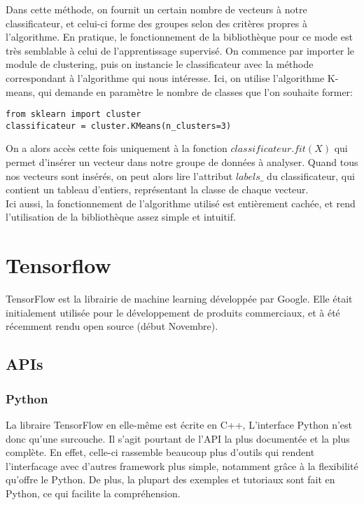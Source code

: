 Dans cette méthode, on fournit un certain nombre de vecteurs à notre classificateur, et celui-ci forme des groupes selon des critères propres à l'algorithme. En pratique, le fonctionnement de la bibliothèque pour ce mode est très semblable à celui de l'apprentissage supervisé.
On commence par importer le module de clustering, puis on instancie le classificateur avec la méthode correspondant à l'algorithme qui nous intéresse. Ici, on utilise l'algorithme K-means, qui demande en paramètre le nombre de classes que l'on souhaite former:
\begin{Verbatim}
from sklearn import cluster
classificateur = cluster.KMeans(n_clusters=3)
\end{Verbatim}
On a alors accès cette fois uniquement à la fonction $classificateur.fit(X)$ qui permet d'insérer un vecteur dans notre groupe de données à analyser. Quand tous nos vecteurs sont insérés, on peut alors lire l'attribut $labels\_$ du classificateur, qui contient un tableau d'entiers, représentant la classe de chaque vecteur.\\

Ici aussi, la fonctionnement de l'algorithme utilisé est entièrement cachée, et rend l'utilisation de la bibliothèque assez simple et intuitif.


\section{Tensorflow}

TensorFlow est la librairie de machine learning développée par Google. Elle était initialement utilisée pour le développement de produits commerciaux, et à été récemment rendu open source (début Novembre).

\subsection{APIs}

\subsubsection{Python}

La libraire TensorFlow en elle-même est écrite en C++, L'interface Python n'est donc qu'une surcouche. Il s'agit pourtant de l'API la plus documentée et la plus complète. En effet, celle-ci rassemble beaucoup plus d'outils qui rendent l'interfacage avec d'autres framework plus simple, notamment grâce à la flexibilité qu'offre le Python. De plus, la plupart des exemples et tutoriaux sont fait en Python, ce qui facilite la compréhension.

